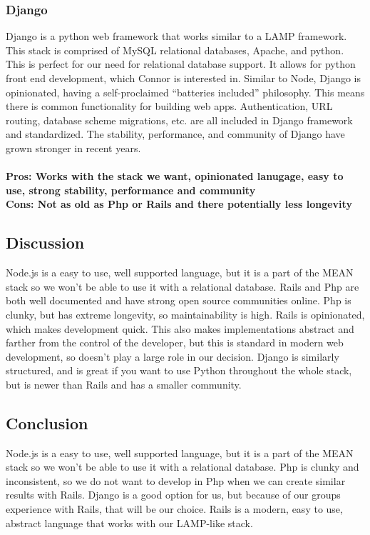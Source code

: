 \documentclass[draftclsnofoot,onecolumn,letterpaper,10pt,compsoc]{IEEEtran}
\begin{document}
  		\subsubsection{Django}
				Django is a python web framework that works similar to a LAMP framework.
				This stack is comprised of MySQL relational databases, Apache, and python\cite{Bitnami}.
				This is perfect for our need for relational database support. It allows for python front end development, which Connor is interested in.
				Similar to Node, Django is opinionated, having a self-proclaimed “batteries included” philosophy\cite{FullStackPython}.
				This means there is common functionality for building web apps. Authentication, URL routing, database scheme migrations, etc. are all included in Django framework and standardized\cite{FullStackPython}.
				The stability, performance, and community of Django have grown stronger in recent years\cite{FullStackPython}.
				\\ \\
				\textbf{Pros: Works with the stack we want, opinionated lanugage, easy to use, strong stability, performance and community }
				\\
				\textbf{Cons: Not as old as Php or Rails and there potentially less longevity}

				\subsection{Discussion}
				Node.js is a easy to use, well supported language, but it is a part of the MEAN stack so we won’t be able to use it with a relational database.
				Rails and Php are both well documented and have strong open source communities online.
				Php is clunky, but has extreme longevity, so maintainability is high.
				Rails is opinionated, which makes development quick.
				This also makes implementations abstract and farther from the control of the developer, but this is standard in modern web development, so doesn't play a large role in our decision.
        Django is similarly structured, and is great if you want to use Python throughout the whole stack, but is newer than Rails and has a smaller community.

				\subsection{Conclusion}
				Node.js is a easy to use, well supported language, but it is a part of the MEAN stack so we won’t be able to use it with a relational database.
				Php is clunky and inconsistent, so we do not want to develop in Php when we can create similar results with Rails.
        Django is a good option for us, but because of our groups experience with Rails, that will be our choice.
				Rails is a modern, easy to use, abstract language that works with our LAMP-like stack.
\end{document}
